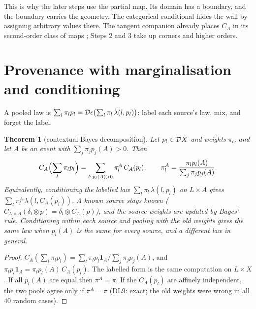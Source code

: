 \documentclass[11pt]{article}
\newtheorem{theorem}{Theorem}\newtheorem{proposition}[theorem]{Proposition}\newtheorem{lemma}[theorem]{Lemma}\newtheorem{corollary}[theorem]{Corollary}\newtheorem{conjecture}[theorem]{Conjecture}
\theoremstyle{definition}\newtheorem{definition}[theorem]{Definition}\newtheorem{remark}[theorem]{Remark}\newtheorem{example}[theorem]{Example}
\begin{document}
This is why the later steps use the partial map. Its domain has a boundary, and the boundary carries the geometry. The categorical
conditional hides the wall by assigning arbitrary values there. The tangent companion already places $C_A$ in its second-order class of
maps \cite[Corollary ``the second-order subcategory'']{TangentCompanion}; Steps 2 and 3 take up corners and higher orders.

\section{Provenance with marginalisation and conditioning}\label{sec:context}
A pooled law is $\sum_l\pi_lp_l=\mathcal D\epsilon\bigl(\sum_l\pi_l\,\lambda(l,p_l)\bigr)$: label each source's law, mix, and forget the label.

\begin{theorem}[contextual Bayes decomposition]\label{thm:bayes}
Let $p_l\in\mathcal D X$ and weights $\pi_l$, and let $A$ be an event with $\sum_j\pi_jp_j(A)>0$. Then
\[
C_A\Bigl(\sum_l\pi_lp_l\Bigr)=\sum_{l:\,p_l(A)>0}\pi^A_l\,C_A(p_l),\qquad\pi^A_l=\frac{\pi_lp_l(A)}{\sum_j\pi_jp_j(A)} .
\]
Equivalently, conditioning the labelled law $\sum_l\pi_l\,\lambda(l,p_l)$ on $L\times A$ gives $\sum_l\pi^A_l\,\lambda(l,C_A(p_l))$. A known source
stays known ($C_{L\times A}(\delta_l\otimes p)=\delta_l\otimes C_A(p)$), and the source weights are updated by Bayes' rule. Conditioning within each
source and pooling with the \emph{old} weights gives the same law when $p_l(A)$ is the same for every source, and a different law in general.
\end{theorem}

\begin{proof}
$C_A(\sum_l\pi_lp_l)=\sum_l\pi_lp_l\mathbf 1_A/\sum_j\pi_jp_j(A)$, and $\pi_lp_l\mathbf 1_A=\pi_lp_l(A)\,C_A(p_l)$. The labelled form is the same
computation on $L\times X$. If all $p_l(A)$ are equal then $\pi^A=\pi$. If the $C_A(p_l)$ are affinely independent, the two pools agree only if
$\pi^A=\pi$ (DL9: exact; the old weights were wrong in all $40$ random cases).
\end{proof}
\end{document}
